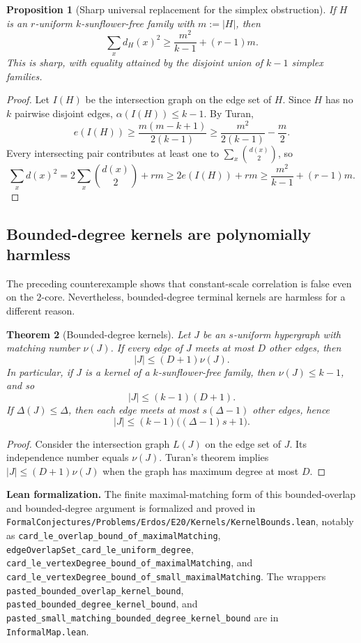 \documentclass[11pt]{article}
\newtheorem{theorem}{Theorem}[section]
\newtheorem{proposition}[theorem]{Proposition}
\theoremstyle{definition}
\newcommand{\1}{\mathbf{1}}
\newcommand{\leannote}[1]{\par\smallskip\noindent\textbf{Lean formalization.} #1\par\smallskip}
\begin{document}
\begin{proposition}[Sharp universal replacement for the simplex obstruction]
If $H$ is an $r$-uniform $k$-sunflower-free family with $m:=|H|$, then
\[
\sum_x d_H(x)^2\ge \frac{m^2}{k-1}+(r-1)m.
\]
This is sharp, with equality attained by the disjoint union of $k-1$ simplex families.
\end{proposition}

\begin{proof}
Let $I(H)$ be the intersection graph on the edge set of $H$. Since $H$ has no $k$ pairwise disjoint edges, $\alpha(I(H))\le k-1$. By Turan,
\[
e(I(H))\ge \frac{m(m-k+1)}{2(k-1)}\ge \frac{m^2}{2(k-1)}-\frac{m}{2}.
\]
Every intersecting pair contributes at least one to $\sum_x \binom{d(x)}{2}$, so
\[
\sum_x d(x)^2 = 2\sum_x \binom{d(x)}{2}+rm\ge 2e(I(H))+rm\ge \frac{m^2}{k-1}+(r-1)m.
\]
\end{proof}

\subsection*{Bounded-degree kernels are polynomially harmless}
The preceding counterexample shows that constant-scale correlation is false even on the $2$-core. Nevertheless, bounded-degree terminal kernels are harmless for a different reason.

\begin{theorem}[Bounded-degree kernels]\label{thm:bounded-degree}
Let $J$ be an $s$-uniform hypergraph with matching number $\nu(J)$. If every edge of $J$ meets at most $D$ other edges, then
\[
|J|\le (D+1)\nu(J).
\]
In particular, if $J$ is a kernel of a $k$-sunflower-free family, then $\nu(J)\le k-1$, and so
\[
|J|\le (k-1)(D+1).
\]
If $\Delta(J)\le \Delta$, then each edge meets at most $s(\Delta-1)$ other edges, hence
\[
|J|\le (k-1)\bigl((\Delta-1)s+1\bigr).
\]
\end{theorem}

\begin{proof}
Consider the intersection graph $L(J)$ on the edge set of $J$. Its independence number equals $\nu(J)$. Turan's theorem implies $|J|\le (D+1)\nu(J)$ when the graph has maximum degree at most $D$.
\end{proof}

\leannote{The finite maximal-matching form of this bounded-overlap and bounded-degree argument is formalized and proved in \texttt{FormalConjectures/Problems/Erdos/E20/Kernels/KernelBounds.lean}, notably as \texttt{card\_le\_overlap\_bound\_of\_maximalMatching}, \texttt{edgeOverlapSet\_card\_le\_uniform\_degree}, \texttt{card\_le\_vertexDegree\_bound\_of\_maximalMatching}, and \texttt{card\_le\_vertexDegree\_bound\_of\_small\_maximalMatching}. The wrappers \texttt{pasted\_bounded\_overlap\_kernel\_bound}, \texttt{pasted\_bounded\_degree\_kernel\_bound}, and \texttt{pasted\_small\_matching\_bounded\_degree\_kernel\_bound} are in \texttt{InformalMap.lean}.}
\end{document}

